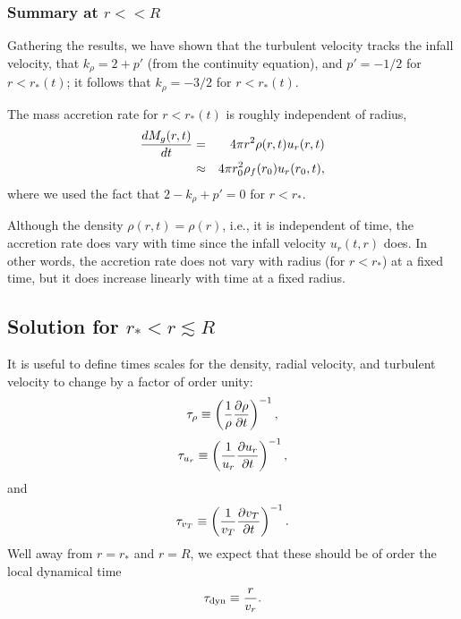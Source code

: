 \documentclass[iop,apj,numberedappendix]{emulateapj}
\newcommand       \be		{\begin{equation}}
\newcommand       \ee		{\end{equation}}
\newcommand       \bea          {\begin{eqnarray}}
\newcommand       \eea          {\end{eqnarray}}
\newcommand       \etaeff       {\eta}
\newcommand       \tdyn         {\tau_{\rm dyn}}
\newcommand       \R           {r_0}
\begin{document}




\subsubsection{Summary at $r<<R$}

Gathering the results, we have shown that the turbulent velocity
tracks the infall velocity, that $k_\rho=2+p'$ (from the continuity
equation), and $p'=-1/2$ for $r<r_*(t)$; it follows that $k_\rho=-3/2$ for
$r<r_*(t)$.

The mass accretion rate for $r<r_*(t)$ is roughly independent
of radius,
% 
\bea  \label{eqn: flat mdot}%
{dM_g(r,t)\over dt}&=&4\pi r^2 \rho(r,t)u_r(r,t)\nonumber\\
&\approx& 4\pi \R^2\rho_f(\R)u_r(\R,t),
\eea  %
%
where we used the fact that $2-k_\rho+p'=0$ for $r<r_*$.  

Although the density $\rho(r,t)=\rho(r)$, i.e., it is independent of
time, the accretion rate does vary with time since the infall velocity
$u_r(t,r)$ does. In other words, the accretion rate does not vary with
radius (for $r<r_*$) at a fixed time, but it does increase linearly
with time at a fixed radius.


\subsection{Solution for $r_*<r\lesssim R$}
It is useful to define times scales for the density, radial velocity,
and turbulent velocity to change by a factor of order unity:
%
\be  %
\tau_\rho\equiv\left({1\over \rho}{\partial \rho\over \partial t}\right)^{-1},
\ee  %
%
%
\be  \label{eqn: tau u_r}%
\tau_{u_r}\equiv\left({1\over u_r}{\partial u_r\over \partial t}\right)^{-1},
\ee  %
%
and
%
\be  %
\tau_{v_T}\equiv\left({1\over v_T}{\partial v_T\over \partial t}\right)^{-1}.
\ee  %
%
Well away from $r=r_*$ and $r=R$, we expect that these should be of
order the local dynamical time
%
\be  %
\tdyn\equiv{r\over v_r}.
\ee  %
%
\end{document}
